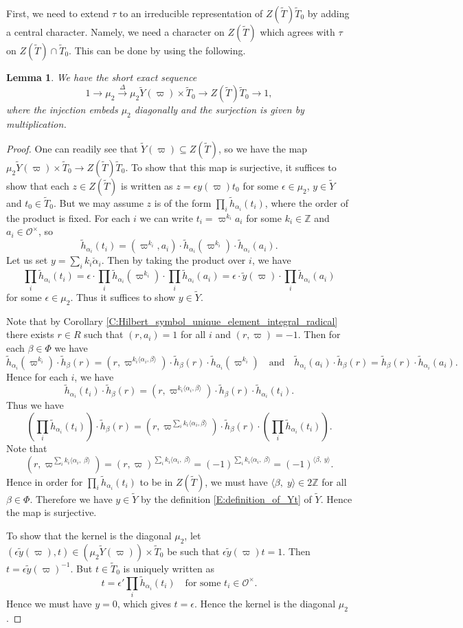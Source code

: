 \documentclass[10pt, letterpaper]{amsart}
\theoremstyle{plain}
\newtheorem{Lem}[equation]{Lemma}
\theoremstyle{definition}
\numberwithin{equation}{section}
\newcommand{\Z}{\mathbb{Z}}
\newcommand{\yt}{\tilde{y}}
\newcommand{\htt}{\tilde{h}}
\newcommand{\alphac}{{\check{\alpha}}}
\newcommand{\Tt}{\widetilde{T}}
\newcommand{\Yt}{\widetilde{Y}}
\newcommand{\Ocal}{\mathcal{O}}
\newcommand{\la}{\langle}
\newcommand{\ra}{\rangle}
\newcommand{\qand}{{\quad\text{and}\quad}}
\begin{document}
First, we need to extend $\tau$ to an irreducible representation of $Z(\Tt)\Tt_0$ by adding a central character. Namely, we need a character on $Z(\Tt)$ which agrees with $\tau$ on $Z(\Tt)\cap\Tt_0$. This can be done by using the following.
\begin{Lem}
We have the short exact sequence
\[
1\longrightarrow\mu_2 \xrightarrow{\;\Delta\;}\mu_2\Yt(\varpi)\times \Tt_0\longrightarrow Z(\Tt)\Tt_0\longrightarrow 1,
\]
where the injection embeds $\mu_2$ diagonally and the surjection is given by multiplication.
\end{Lem}
\begin{proof}
One can readily see that $\Yt(\varpi)\subseteq Z(\Tt)$, so we have the map $\mu_2\Yt(\varpi)\times \Tt_0\to Z(\Tt)\Tt_0$. To show that this map is surjective, it suffices to show that each $z\in Z(\Tt)$ is written as $z=\epsilon y(\varpi)t_0$ for some $\epsilon \in\mu_2$, $y\in \Yt$ and $t_0\in\Tt_0$. But we may assume $z$ is of the form $\prod_{i}\htt_{\alpha_i}(t_i)$, where the order of the product is fixed. For each $i$ we can write $t_i=\varpi^{k_i}a_i$ for some $k_i\in\Z$ and $a_i\in\Ocal^\times$, so
\[
\htt_{\alpha_i}(t_i)=(\varpi^{k_i}, a_i)\cdot\htt_{\alpha_i}(\varpi^{k_i})\cdot\htt_{\alpha_i}(a_i).
\]
Let us set $y=\sum_ik_i\alphac_i$. Then by taking the product over $i$, we have
\[
\prod_i\htt_{\alpha_i}(t_i)=\epsilon\cdot\prod_i\htt_{\alpha_i}(\varpi^{k_i})\cdot\prod_i\htt_{\alpha_i}(a_i)=\epsilon\cdot \yt(\varpi)\cdot\prod_i\htt_{\alpha_i}(a_i)
\]
for some $\epsilon\in\mu_2$. Thus it suffices to show $y\in\Yt$.

Note that by Corollary \ref{C:Hilbert_symbol_unique_element_integral_radical} there exists $r\in R$ such that $(r, a_i)=1$ for all $i$ and $(r, \varpi)=-1$. Then for each $\beta\in\Phi$ we have
\[
\htt_{\alpha_i}(\varpi^{k_i})\cdot\htt_\beta(r)=(r, \varpi^{k_i\la \alpha_i, \beta\ra})\cdot \htt_\beta(r)\cdot\htt_{\alpha_i}(\varpi^{k_i}) 
\qand
\htt_{\alpha_i}(a_i)\cdot \htt_\beta(r)=\htt_\beta(r)\cdot\htt_{\alpha_i}(a_i).
\]
Hence for each $i$, we have
\[
\htt_{\alpha_i}(t_i)\cdot\htt_{\beta}(r)=(r, \varpi^{k_i\la \alpha_i, \beta\ra})\cdot \htt_{\beta}(r)\cdot \htt_{\alpha_i}(t_i).
\]
Thus we have
\[
\left(\prod_i\htt_{\alpha_i}(t_i)\right)\cdot\htt_{\beta}(r)=(r, \varpi^{\sum_ik_i\la \alpha_i, \beta\ra})\cdot\htt_{\beta}(r)\cdot\left(\prod_i \htt_{\alpha_i}(t_i)\right).
\]
Note that
\[
(r, \varpi^{\sum_ik_i\la \alpha_i,\; \beta\ra})=(r, \varpi)^{\sum_ik_i\la \alpha_i,\; \beta\ra}=(-1)^{\sum_ik_i\la \alpha_i,\; \beta\ra}=(-1)^{\la \beta,\; y\ra}.
\]
Hence in order for $\prod_{i}\htt_{\alpha_i}(t_i)$ to be in $Z(\Tt)$, we must have $\la \beta,\; y\ra\in2\Z$ for all $\beta\in\Phi$. Therefore we have $y\in\Yt$ by the definition \eqref{E:definition_of_Yt} of $\Yt$. Hence the map is surjective.

To show that the kernel is the diagonal $\mu_2$, let $(\epsilon \yt(\varpi), t)\in (\mu_2\Yt(\varpi))\times \Tt_0$ be such that $\epsilon\yt(\varpi)t=1$. Then $t=\epsilon\yt(\varpi)^{-1}$. But $t\in \Tt_0$ is uniquely written as
\[
t=\epsilon'\prod_i\htt_{\alpha_i}(t_i)\quad \text{for some $t_i\in\Ocal^\times$}.
\]
Hence we must have $y=0$, which gives $t=\epsilon$. Hence the kernel is the diagonal $\mu_2$.
\end{proof}
\end{document}
